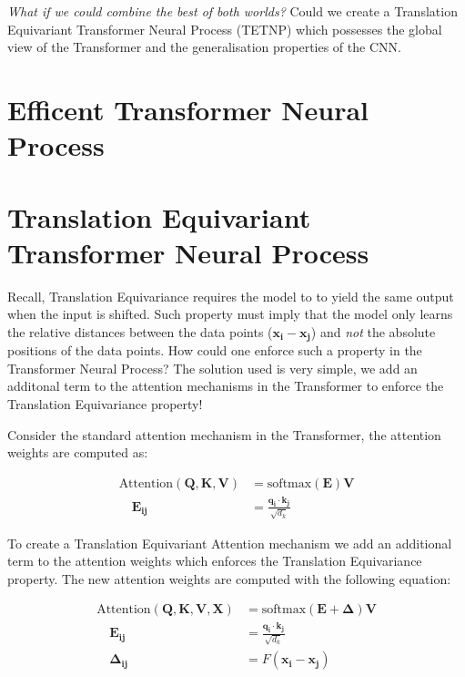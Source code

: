 \documentclass[../../main.tex]{subfiles}
\begin{document}
\emph{What if we could combine the best of both worlds?} Could we create a Translation Equivariant Transformer Neural Process (TETNP) which possesses the global view of the Transformer and the generalisation properties of the CNN.


\section{Efficent Transformer Neural Process}



\section{Translation Equivariant Transformer Neural Process}

Recall, Translation Equivariance requires the model to to yield the same output when the input is shifted. Such property must imply that the model only learns the relative distances between the data points ($\bm{x_i} - \bm{x_j}$) and \emph{not} the absolute positions of the data points. How could one enforce such a property in the Transformer Neural Process? The solution used is very simple, we add an additonal term to the attention mechanisms in the Transformer to enforce the Translation Equivariance property!

Consider the standard attention mechanism in the Transformer, the attention weights are computed as:


\begin{align}
	\text{Attention}(\bm{Q}, \bm{K}, \bm{V}) &= \text{softmax}\left(\bm{E} \right) \bm{V}\\
	 \quad \bm{E_{ij}} &= \frac{\bm{q_i} \cdot \bm{k_j}}{\sqrt{d_k}}
\end{align}

To create a Translation Equivariant Attention mechanism we add an additional term to the attention weights which enforces the Translation Equivariance property. The new attention weights are computed with the following equation:

\begin{align}
	\text{Attention}(\bm{Q}, \bm{K}, \bm{V}, \bm{X}) &= \text{softmax}\left(\bm{E} + \bm{\Delta} \right) \bm{V}\\
	\quad \bm{E_{ij}} &= \frac{\bm{q_i} \cdot \bm{k_j}}{\sqrt{d_k}}\\
	 \quad \bm{\Delta_{ij}} &= F(\bm{x_i} - \bm{x_j})
\end{align}
\end{document}
